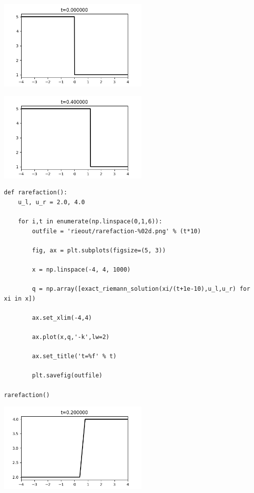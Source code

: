 \documentclass[12pt,fleqn]{article}\usepackage{../../common}
\begin{document}
\includegraphics[width=20em]{rieout/shock-0.png}

\includegraphics[width=20em]{rieout/shock-4.png}


\begin{verbatim}        
def rarefaction():
    u_l, u_r = 2.0, 4.0
    
    for i,t in enumerate(np.linspace(0,1,6)):
        outfile = 'rieout/rarefaction-%02d.png' % (t*10)

        fig, ax = plt.subplots(figsize=(5, 3))
                    
        x = np.linspace(-4, 4, 1000)
        
        q = np.array([exact_riemann_solution(xi/(t+1e-10),u_l,u_r) for xi in x])

        ax.set_xlim(-4,4)

        ax.plot(x,q,'-k',lw=2)
    
        ax.set_title('t=%f' % t)

        plt.savefig(outfile)

rarefaction()
\end{verbatim}


\includegraphics[width=20em]{rieout/rarefaction-2.png}
\end{document}
